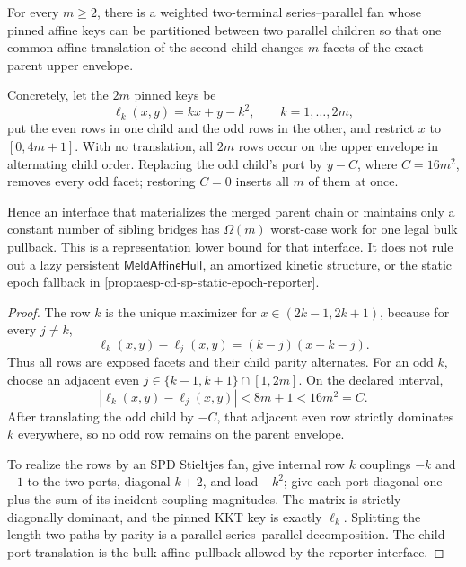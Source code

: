 \begin{proposition}
\label{prop:aesp-cd-sp-alternating-meld-stop}
For every \(m\geq2\), there is a weighted two-terminal
series--parallel fan whose pinned affine keys can be partitioned between two
parallel children so that one common affine translation of the second child
changes \(m\) facets of the exact parent upper envelope.

Concretely, let the \(2m\) pinned keys be
\begin{equation*}
 \ell_k(x,y)=kx+y-k^2,\qquad k=1,\ldots,2m,
\end{equation*}
put the even rows in one child and the odd rows in the other, and restrict
\(x\) to \([0,4m+1]\).  With no translation, all \(2m\) rows occur on the
upper envelope in alternating child order.  Replacing the odd child's port
by \(y-C\), where \(C=16m^2\), removes every odd facet; restoring \(C=0\)
inserts all \(m\) of them at once.

Hence an interface that materializes the merged parent chain or maintains
only a constant number of sibling bridges has \(\Omega(m)\) worst-case work
for one legal bulk pullback.  This is a representation lower bound for that
interface.  It does not rule out a lazy persistent
\(\mathsf{MeldAffineHull}\), an amortized kinetic structure, or the static
epoch fallback in
\cref{prop:aesp-cd-sp-static-epoch-reporter}.
\end{proposition}

\begin{proof}
The row \(k\) is the unique maximizer for
\(x\in(2k-1,2k+1)\), because for every \(j\neq k\),
\begin{equation*}
 \ell_k(x,y)-\ell_j(x,y)=(k-j)(x-k-j).
\end{equation*}
Thus all rows are exposed facets and their child parity alternates.  For an
odd \(k\), choose an adjacent even \(j\in\{k-1,k+1\}\cap[1,2m]\).  On the
declared interval,
\begin{equation*}
 |\ell_k(x,y)-\ell_j(x,y)|<8m+1<16m^2=C.
\end{equation*}
After translating the odd child by \(-C\), that adjacent even row strictly
dominates \(k\) everywhere, so no odd row remains on the parent envelope.

To realize the rows by an SPD Stieltjes fan, give internal row \(k\)
couplings \(-k\) and \(-1\) to the two ports, diagonal \(k+2\), and load
\(-k^2\); give each port diagonal one plus the sum of its incident coupling
magnitudes.  The matrix is strictly diagonally dominant, and the pinned KKT
key is exactly \(\ell_k\).  Splitting the length-two paths by parity is a
parallel series--parallel decomposition.  The child-port translation is the
bulk affine pullback allowed by the reporter interface.
\end{proof}

